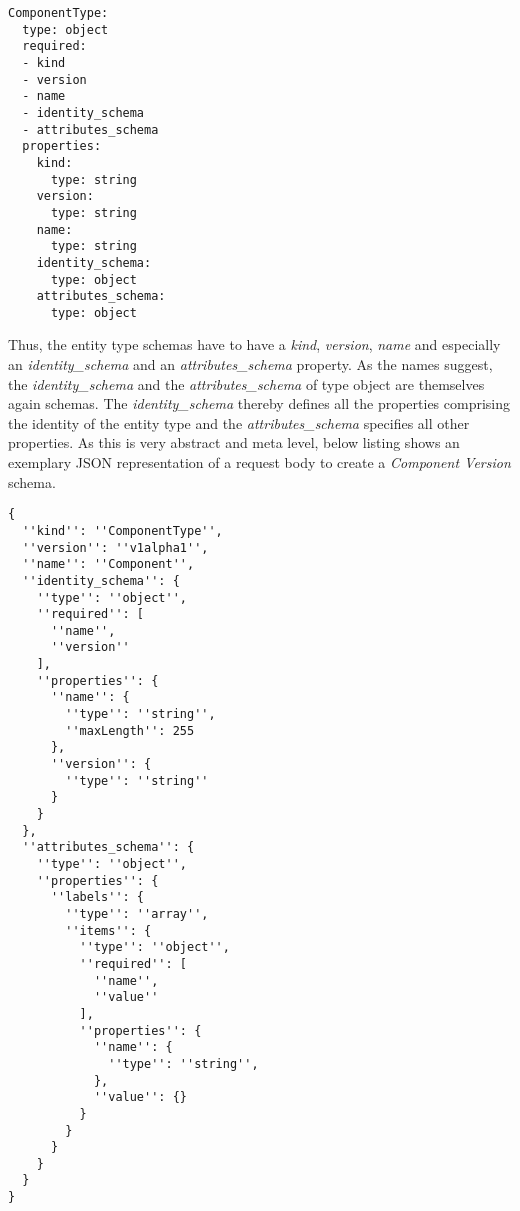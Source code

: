 \begin{lstlisting}[basicstyle=\tiny, caption=Entity Type Schema Schema, captionpos=b, label=lst:EntityTypeSchemaSchema]
ComponentType:
  type: object
  required:
  - kind
  - version
  - name
  - identity_schema
  - attributes_schema
  properties:
    kind: 
      type: string
    version:
      type: string
    name:
      type: string
    identity_schema:
      type: object
    attributes_schema:
      type: object
\end{lstlisting}

Thus, the entity type schemas have to have a \emph{kind}, \emph{version}, \emph{name} and especially an \emph{identity\_schema} and an \emph{attributes\_schema} property. As the names suggest, the \emph{identity\_schema} and the \emph{attributes\_schema} of type object are themselves again schemas. The \emph{identity\_schema} thereby defines all the properties comprising the identity of the entity type and the \emph{attributes\_schema} specifies all other properties. As this is very abstract and meta level, below listing shows an exemplary JSON representation of a request body to create a \emph{Component Version} schema. 

\begin{lstlisting}[basicstyle=\tiny, caption=Request Body for Component Version Schema Creation, captionpos=b, label=lst:ComponentVersionSchemaCreation]
{
  ''kind'': ''ComponentType'',
  ''version'': ''v1alpha1'',
  ''name'': ''Component'',
  ''identity_schema'': {
    ''type'': ''object'',
    ''required'': [
      ''name'',
      ''version''
    ],
    ''properties'': {
      ''name'': {
        ''type'': ''string'',
        ''maxLength'': 255
      },
      ''version'': {
        ''type'': ''string''
      }
    }
  },
  ''attributes_schema'': {
    ''type'': ''object'',
    ''properties'': {
      ''labels'': {
        ''type'': ''array'',
        ''items'': {
          ''type'': ''object'',
          ''required'': [
            ''name'',
            ''value''
          ],
          ''properties'': {
            ''name'': {
              ''type'': ''string'',
            },
            ''value'': {}
          }
        }  
      }
    }
  }
}
\end{lstlisting}

